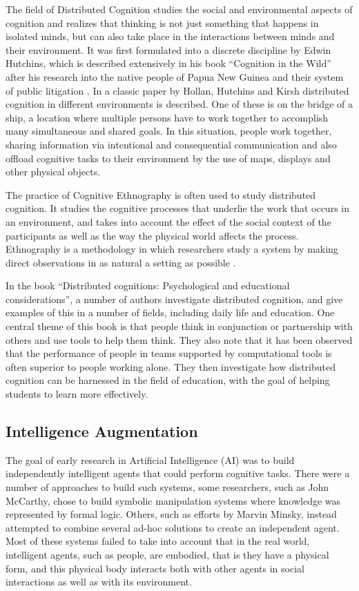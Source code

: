 The field of Distributed Cognition studies the social and
environmental aspects of cognition and realizes that thinking is not
just something that happens in isolated minds, but can also take place
in the interactions between minds and their environment.  It was first
formulated into a discrete discipline by Edwin Hutchins, which is
described extensively in his book ``Cognition in the Wild''
\cite{hutchins96} after his research into the native people of Papua
New Guinea and their system of public litigation \cite{hutchins80}.
In a classic paper by Hollan, Hutchins and Kirsh \cite{hollan00}
distributed cognition in different environments is described.  One of
these is on the bridge of a ship, a location where multiple persons
have to work together to accomplish many simultaneous and shared
goals.  In this situation, people work together, sharing information
via intentional and consequential communication and also offload
cognitive tasks to their environment by the use of maps, displays and
other physical objects.

The practice of Cognitive Ethnography \cite{hollan00} is often used to
study distributed cognition.  It studies the cognitive processes that
underlie the work that occurs in an environment, and takes into account
the effect of the social context of the participants as well as the
way the physical world affects the process.  Ethnography is a
methodology in which researchers study a system by making direct
observations in as natural a setting as possible \cite{mcgrath95}.

In the book ``Distributed cognitions: Psychological and educational
considerations'', \cite{salomon97} a number of authors investigate
distributed cognition, and give examples of this in a number of
fields, including daily life and education.  One central theme of this
book is that people think in conjunction or partnership with others
and use tools to help them think.  They also note that it has been
observed that the performance of people in teams supported by
computational tools is often superior to people working alone.  They
then investigate how distributed cognition can be harnessed in the
field of education, with the goal of helping students to learn more
effectively.


\subsection{Intelligence Augmentation}

The goal of early research in Artificial Intelligence (AI) was to
build independently intelligent agents that could perform cognitive
tasks.  There were a number of approaches to build such systems, some
researchers, such as John McCarthy, chose to build symbolic
manipulation systems where knowledge was represented by formal logic.
Others, such as efforts by Marvin Minsky, instead attempted to combine
several ad-hoc solutions to create an independent agent.  Most of
these systems failed to take into account that in the real world,
intelligent agents, such as people, are embodied, that is they have a
physical form, and this physical body interacts both with other agents
in social interactions as well as with its environment. 

